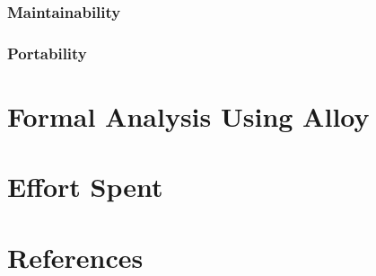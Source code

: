 \documentclass{paper}
\begin{document}
        \subsubsection{Maintainability}
        
        \subsubsection{Portability}
        
\newpage
\section{Formal Analysis Using Alloy}

\newpage
\section{Effort Spent}

\newpage
\section{References}
\end{document}
